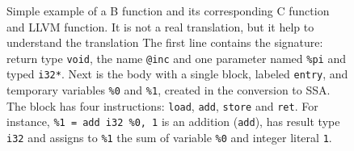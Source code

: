 \documentclass{llncs}
\newcommand{\llvm}[1]{\texttt{#1}}
\begin{document}
\begin{figure}
\begin{minipage}[t]{.6\textwidth}
  \end{minipage}
  \caption{Simple example of a B function and its corresponding  C function and LLVM function.
    It is not a real translation, but it help to understand the translation %
    The first line contains the signature: return type \llvm{void}, the name
    \llvm{@inc} and one parameter named \llvm{\%pi} and typed \llvm{i32*}.  Next
    is the body with a single block, labeled \llvm{entry}, and temporary
    variables \llvm{\%0} and \llvm{\%1}, created in the conversion to SSA. The
    block has four instructions: \llvm{load}, \llvm{add}, \llvm{store} and
    \llvm{ret}. For instance, \llvm{\%1 = add i32 \%0, 1} is an addition
    (\llvm{add}), has result type \llvm{i32} and assigns to
    \llvm{\%1} the sum of variable \llvm{\%0} and integer
    literal \llvm{1}.}
  \label{fig:ex-llvm}
\end{figure}
\end{document}
